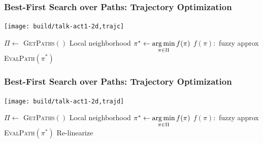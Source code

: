 \begin{frame}
   \frametitle{Best-First Search over Paths: Trajectory Optimization}
   \begin{center}
      \texttt{[image: build/talk-act1-2d,trajc]}
      
      \begin{minipage}{0.8\textwidth}
      \begin{algorithmic}
      \Loop
         \State $\Pi \leftarrow $ \textsc{GetPaths}$()$
            \Comment Local neighborhood
         \State $\pi^* \leftarrow \operatorname*{arg\,min}\limits_{\pi \in \Pi} f(\pi)$
            \Comment $f(\pi):$ fuzzy approx
         \State \textsc{EvalPath}$(\pi^*)$
            \Comment {}
      \EndLoop
      \end{algorithmic}
      \end{minipage}
   \end{center}
\end{frame}

\begin{frame}
   \frametitle{Best-First Search over Paths: Trajectory Optimization}
   \begin{center}
      \texttt{[image: build/talk-act1-2d,trajd]}
      
      \begin{minipage}{0.8\textwidth}
      \begin{algorithmic}
      \Loop
         \State $\Pi \leftarrow $ \textsc{GetPaths}$()$
            \Comment Local neighborhood
         \State $\pi^* \leftarrow \operatorname*{arg\,min}\limits_{\pi \in \Pi} f(\pi)$
            \Comment $f(\pi):$ fuzzy approx
         \State \textsc{EvalPath}$(\pi^*)$
            \Comment Re-linearize
      \EndLoop
      \end{algorithmic}
      \end{minipage}
   \end{center}
\end{frame}

